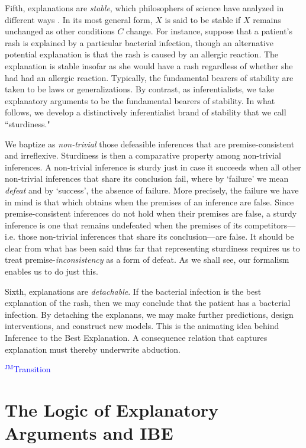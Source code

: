 \documentclass{article}
\theoremstyle{definition}
\theoremstyle{definition}
\theoremstyle{definition}
\theoremstyle{definition}
\theoremstyle{remark}
\theoremstyle{definition}
\theoremstyle{definition}
\newcommand{\jm}[1]{\textcolor{blue}{$^{\textrm{JM}}${#1}}}
\begin{document}
Fifth, explanations are \textit{stable}, which philosophers of science have analyzed in different ways \citep{Hempel1965,Lange2009,Mitchell2003,Skyrms1980,Woodward2003}. In its most general form, $X$ is said to be stable if $X$ remains unchanged as other conditions $C$ change. For instance, suppose that a patient's rash is explained by a particular bacterial infection, though an alternative potential explanation is that the rash is caused by an allergic reaction. The explanation is stable insofar as she would have a rash regardless of whether she had had an allergic reaction. Typically, the fundamental bearers of stability are taken to be laws or generalizations. By contrast, as inferentialists, we take explanatory arguments to be the fundamental bearers of stability. In what follows, we develop a distinctively inferentialist brand of stability that we call ``sturdiness." 

We baptize as \textit{non-trivial} those defeasible inferences that are premise-consistent and irreflexive. Sturdiness is then a comparative property among non-trivial inferences. A non-trivial inference is sturdy just in case it succeeds when all other non-trivial inferences that share its conclusion fail, where by `failure' we mean \textit{defeat} and by `success', the absence of failure. More precisely, the failure we have in mind is that which obtains when the premises of an inference are false. Since  premise-consistent inferences do not hold when their premises are false, a sturdy inference is one that remains undefeated when the premises of its competitors---i.e. those non-trivial inferences that share its conclusion---are false. It should be clear from what has been said thus far that representing sturdiness requires us to treat premise-\textit{inconsistency} as a form of defeat. As we shall see, our formalism enables us to do just this.

Sixth, explanations are \textit{detachable}. If the bacterial infection is the best explanation of the rash, then we may conclude that the patient has a bacterial infection. By detaching the explanans, we may make further predictions, design interventions, and construct new models. This is the animating idea behind Inference to the Best Explanation. A consequence relation that captures explanation must thereby underwrite abduction. 

\jm{Transition}

\section{The Logic of Explanatory Arguments and IBE}
\end{document}
